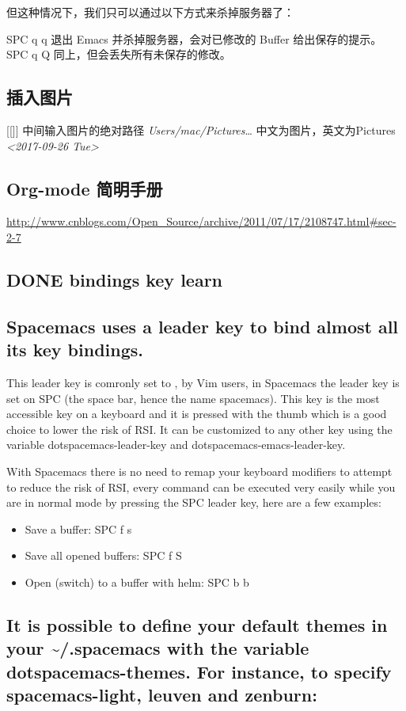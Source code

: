\documentclass[11pt]{ctexart}
\begin{document}
但这种情况下，我们只可以通过以下方式来杀掉服务器了：

SPC q q 退出 Emacs 并杀掉服务器，会对已修改的 Buffer 给出保存的提示。
SPC q Q 同上，但会丢失所有未保存的修改。

\subsection{插入图片}
\label{sec:org3ea4032}
[[]]
中间输入图片的绝对路径
\emph{Users/mac/Pictures}\ldots{}
中文为图片，英文为Pictures
\textit{<2017-09-26 Tue>}
\subsection{Org-mode 简明手册}
\label{sec:org78e1ce1}
\url{http://www.cnblogs.com/Open\_Source/archive/2011/07/17/2108747.html\#sec-2-7}
\subsection{{\bfseries\sffamily DONE} bindings key learn}
\label{sec:org19636ba}
\subsection{Spacemacs uses a leader key to bind almost all its key bindings.}
\label{sec:org6b69f1e}

This leader key is comronly set to ​,​ by Vim users, in Spacemacs the leader key is set on SPC (the space bar, hence the name spacemacs). This key is the most accessible key on a keyboard and it is pressed with the thumb which is a good choice to lower the risk of RSI. It can be customized to any other key using the variable dotspacemacs-leader-key and dotspacemacs-emacs-leader-key.

With Spacemacs there is no need to remap your keyboard modifiers to attempt to reduce the risk of RSI, every command can be executed very easily while you are in normal mode by pressing the SPC leader key, here are a few examples:

\begin{itemize}
\item Save a buffer: SPC f s
\item Save all opened buffers: SPC f S
\item Open (switch) to a buffer with helm: SPC b b
\end{itemize}
\subsection{It is possible to define your default themes in your \textasciitilde{}/.spacemacs with the variable dotspacemacs-themes. For instance, to specify spacemacs-light, leuven and zenburn:}
\label{sec:org2bbbe50}
\end{document}
